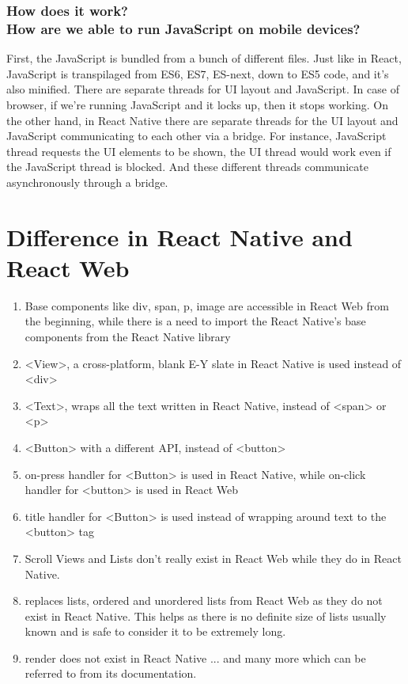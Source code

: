 \begin{appendices}
\subsubsection{How does it work?\\How are we able to run JavaScript on mobile devices?}

First, the JavaScript is bundled from a bunch of different files. Just like in React, JavaScript is transpilaged from ES6, ES7, ES-next, down to ES5 code, and it's also minified. There are separate threads for UI layout and JavaScript. In case of browser, if we're running JavaScript and it locks up, then it stops working. On the other hand, in React Native there are separate threads for the UI layout and JavaScript communicating to each other via a bridge.
For instance, JavaScript thread requests the UI elements to be shown, the UI thread would work even if the JavaScript thread is blocked. And these different threads communicate asynchronously through a bridge.

\section{Difference in React Native and React Web}
\begin{enumerate}
    \item Base components like div, span, p, image are accessible in React Web from the beginning, while there is a need to import the React Native's base components from the React Native library
    \item <View>, a cross-platform, blank E-Y slate in React Native is used instead of <div>
    \item <Text>, wraps all the text written in React Native, instead of <span> or <p>
    \item <Button> with a different API, instead of <button> 
    \item on-press handler for <Button> is used in React Native, while on-click handler for <button>  is used in React Web
    \item title handler for <Button> is used instead of wrapping around text to the <button> tag
    \item Scroll Views and Lists don't really exist in React Web while they do in React Native.
    \item <Scroll Views> replaces lists, ordered and unordered lists from React Web as they do not exist in React Native. This helps as there is no definite size of lists usually known and is safe to consider it to be extremely long.
    \item render does not exist in React Native
... and many more which can be referred to from its documentation.
\end{enumerate}

\end{appendices}